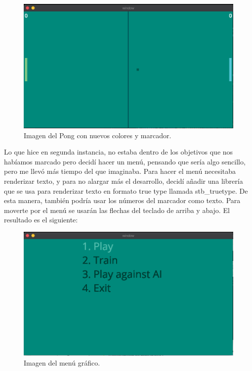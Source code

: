 \begin{figure}[h]
	\centering
	\includegraphics[width=15cm]{archivos/imagenes/pong-nuevos-colores.png}
	\caption{Imagen del Pong con nuevos colores y marcador.}
\end{figure}

Lo que hice en segunda instancia, no estaba dentro de los objetivos que nos habíamos marcado pero decidí hacer un menú, pensando que sería algo sencillo, pero me llevó más tiempo del que imaginaba. Para hacer el menú necesitaba renderizar texto, y para no alargar más el desarrollo, decidí añadir una librería que se usa para renderizar texto en formato true type llamada stb\_truetype. De esta manera, también podría usar los números del marcador como texto. Para moverte por el menú se usarán las flechas del teclado de arriba y abajo. El resultado es el siguiente:

\begin{figure}[h]
	\centering
	\includegraphics[width=15cm]{archivos/imagenes/menu-grafico-integrado-en-el-juego.png}
	\caption{Imagen del menú gráfico.}
\end{figure}

